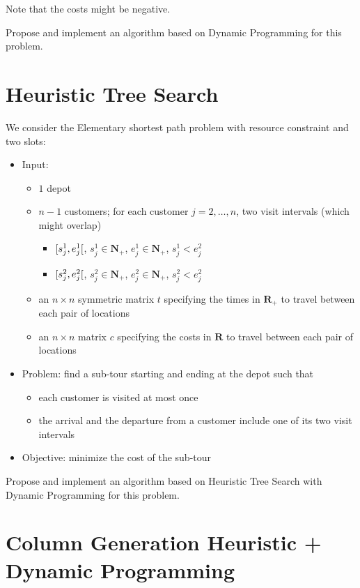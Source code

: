 \documentclass[a4paper]{article}
\newcommand{\N}{\mathbf{N}}
\newcommand{\R}{\mathbf{R}}
\begin{document}
Note that the costs might be negative.

Propose and implement an algorithm based on Dynamic Programming for this problem.

\section{Heuristic Tree Search}

We consider the Elementary shortest path problem with resource constraint and two slots:
\begin{itemize}
  \item Input:
    \begin{itemize}
      \item $1$ depot
      \item $n - 1$ customers; for each customer $j = 2, \dots, n$, two visit intervals (which might overlap)
        \begin{itemize}
          \item $\interval[open right]{s_j^1}{e_j^1}$, $s_j^1 \in \N_+$, $e_j^1 \in \N_+$, $s_j^1 < e_j^2$
          \item $\interval[open right]{s_j^2}{e_j^2}$, $s_j^2 \in \N_+$, $e_j^2 \in \N_+$, $s_j^2 < e_j^2$
        \end{itemize}
      \item an $n \times n$ symmetric matrix $t$ specifying the times in $\R_+$ to travel between each pair of locations
      \item an $n \times n$ matrix $c$ specifying the costs in $\R$ to travel between each pair of locations
    \end{itemize}
  \item Problem: find a sub-tour starting and ending at the depot such that
    \begin{itemize}
      \item each customer is visited at most once
      \item the arrival and the departure from a customer include one of its two visit intervals
    \end{itemize}
  \item Objective: minimize the cost of the sub-tour
\end{itemize}

Propose and implement an algorithm based on Heuristic Tree Search with Dynamic Programming for this problem.

\section{Column Generation Heuristic + Dynamic Programming}
\end{document}
